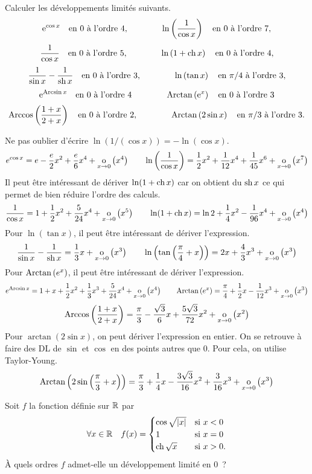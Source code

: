 \documentclass{magnolia}
\begin{document}
Calculer les développements limités suivants.
\[{\rm e}^{\cos x} \quad \text{en 0 à l'ordre 4}, \qquad\qquad
  \ln\left(\frac{1}{\cos x}\right) \quad \text{en 0 à l'ordre 7},\]
\[\frac{1}{\cos x} \quad \text{en 0 à l'ordre 5}, \qquad\qquad
  \ln\left(1+\operatorname{ch} x\right) \quad \text{en 0 à l'ordre 4},\]
\[\frac{1}{\sin x}-\frac{1}{\operatorname{sh} x} \quad \text{en 0 à l'ordre 3},\qquad\qquad
  \ln\left(\tan x\right) \quad \text{en $\pi/4$ à l'ordre 3},\]
\[{\rm e}^{\operatorname{Arcsin} x} \quad \text{en 0 à l'ordre 4}\qquad\qquad
  \operatorname{Arctan}\left({\rm e}^x\right) \quad \text{en 0 à l'ordre 3}\]
\[\operatorname{Arccos}\left(\frac{1+x}{2+x}\right) \quad \text{en 0 à l'ordre 2},\qquad\qquad
 \operatorname{Arctan}\left(2\sin x\right) \quad \text{en $\pi/3$ à l'ordre 3}.\]
\begin{sol}
Ne pas oublier d'écrire $\ln(1/(\cos x))=-\ln(\cos x)$.
\[e^{\cos x}=e-\frac{e}{2}x^2+\frac{e}{6}x^4+\underset{x \rightarrow 0}{\text{o}}\left(x^4\right) \qquad
  \ln\left(\frac{1}{\cos x}\right)=\frac{1}{2}x^2+\frac{1}{12}x^4+\frac{1}{45}x^6+
  \underset{x \rightarrow 0}{\text{o}}\left(x^7\right)\]
Il peut être intéressant de dériver $\ln(1+\operatorname{ch} x)$ car on obtient du $\operatorname{sh} x$
ce qui permet de bien réduire l'ordre des calculs.
\[\frac{1}{\cos x}=1+\frac{1}{2}x^2+\frac{5}{24}x^4+\underset{x \rightarrow 0}{\text{o}}\left(x^5\right) \qquad
  \ln(1+\operatorname{ch} x)=\ln 2+\frac{1}{4}x^2-\frac{1}{96}x^4+\underset{x \rightarrow 0}{\text{o}}\left(x^4\right)\]
Pour $\ln(\tan x)$, il peut être intéressant de dériver l'expression.
\[\frac{1}{\sin x}-\frac{1}{\operatorname{sh} x}=\frac{1}{3}x+\underset{x \rightarrow 0}{\text{o}}\left(x^3\right) \qquad
  \ln\left(\tan\left(\frac{\pi}{4}+x\right)\right)=2x+\frac{4}{3}x^3+\underset{x \rightarrow 0}{\text{o}}\left(x^3\right)\]
Pour $\operatorname{Arctan}\left(e^x\right)$, il peut être intéressant de dériver l'expression.
\[e^{\operatorname{Arcsin} x}=1+x+\frac{1}{2}x^2+\frac{1}{3}x^3+\frac{5}{24}x^4+
  \underset{x \rightarrow 0}{\text{o}}\left(x^4\right) \qquad
  \operatorname{Arctan}\left(e^x\right)=\frac{\pi}{4}+\frac{1}{2}x-\frac{1}{12}x^3+\underset{x \rightarrow 0}{\text{o}}\left(x^3\right)\]
\[\operatorname{Arccos}\left(\frac{1+x}{2+x}\right)=\frac{\pi}{3}-\frac{\sqrt{3}}{6}x+
  \frac{5\sqrt{3}}{72}x^2+\underset{x \rightarrow 0}{\text{o}}\left(x^2\right)\]
Pour $\arctan(2\sin x)$, on peut dériver l'expression en entier. On se
retrouve à faire des DL de $\sin$ et $\cos$ en des points autres que 0. Pour
cela, on utilise Taylor-Young.
\[\operatorname{Arctan}\left(2\sin\left(\frac{\pi}{3}+x\right)\right)=\frac{\pi}{3}+\frac{1}{4}x
  -\frac{3\sqrt{3}}{16}x^2+\frac{3}{16}x^3+\underset{x \rightarrow 0}{\text{o}}\left(x^3\right)\]
\end{sol}

Soit $f$ la fonction définie sur $\mathbb{R}$ par
\[\forall x\in\mathbb{R} \quad f(x)=
  \begin{cases}
  \cos\sqrt{\left|x\right|} & \text{si $x<0$}\\
  1 & \text{si $x=0$}\\  
  \operatorname{ch}\sqrt{x} & \text{si $x>0$.}
  \end{cases}\]
À quels ordres $f$ admet-elle un développement limité en $0$~?
\end{document}
